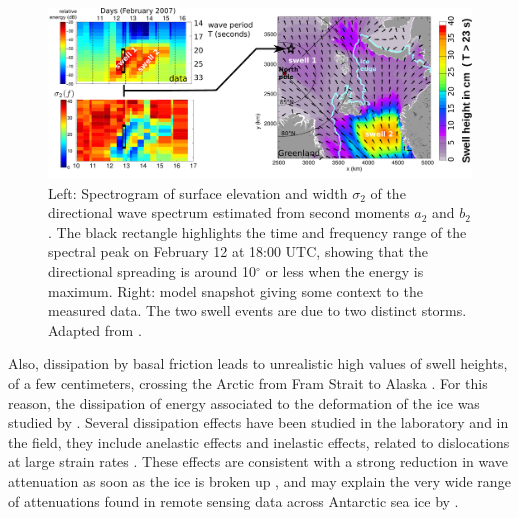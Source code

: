 \begin{figure}[htb]
\centerline{\includegraphics[width=\textwidth]{FIGS_CH_ICE/TARA_data_model.pdf}}
  \caption{Left: Spectrogram of surface elevation and width  $\sigma_2$ of the directional 
wave spectrum estimated from second moments $a_2$ and $b_2$.  The black rectangle highlights the time and frequency range of the spectral peak on February 12 at 18:00 UTC, showing that the directional spreading is around 10$^\circ$ or less when the energy is maximum. Right: model snapshot giving some context to the measured data. The two swell events are due to two distinct storms. Adapted from \cite{Ardhuin&al.2016}.} \label{fig:TARA_data_model}
\end{figure}


Also, dissipation by basal friction leads to unrealistic high values of swell heights, of a few centimeters, crossing the Arctic from Fram Strait to Alaska \citep{Ardhuin&al.2016}. For this reason, the dissipation of energy associated to the deformation of the ice was studied by \cite{Ardhuin&al.2018b,Boutin&al.2018,Ardhuin&al.2020}. Several dissipation effects have been studied in the laboratory and in the field, they include anelastic effects \cite{Cole1995,Cole&al.1998} and inelastic effects, related to dislocations at large strain rates \citep{Cole&Durell2001}.  These effects are consistent with a strong reduction in wave attenuation as soon as the ice is broken up  \citep{Ardhuin&al.2020}, and may explain the very wide range of attenuations found in 
remote sensing data across Antarctic sea ice by \cite{Stopa&al.2018b}. 



